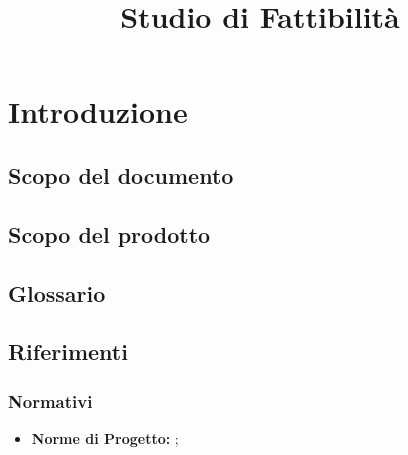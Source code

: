


\author{\AZ}
\supervisor{\LS}
\dest{\TV, \ZU}
\title{Studio di Fattibilità}

\usepackage{hyperref}
\hypersetup{hidelinks}


\maketitle

\tableofcontents
\newpage

\section{Introduzione}
	\subsection{Scopo del documento}
	
	\subsection{Scopo del prodotto}
	\scopo{}
	
	\subsection{Glossario}
	\presgloss{}
	
	\subsection{Riferimenti}
		\subsubsection{Normativi}
		\begin{itemize}
			\item \textbf{Norme di Progetto: } \emph{\NdP};
		\end{itemize}
